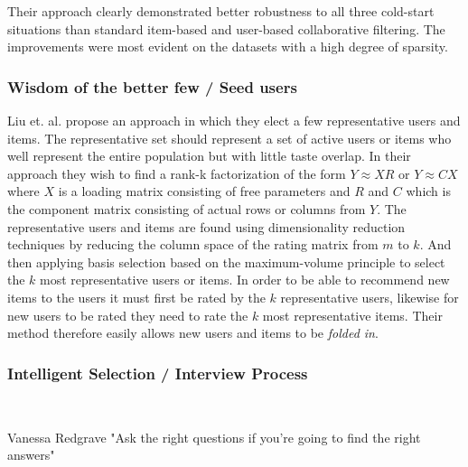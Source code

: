 Their approach clearly demonstrated better robustness to all three cold-start situations than standard item-based
and user-based collaborative filtering. The improvements were most evident on
the datasets with a high degree of sparsity.



\subsubsection{Wisdom of the better few / Seed users}


Liu et. al. \cite{Liu2011} propose an approach in which they elect a few
representative users and items. The representative set should represent a set
of active users or items who well represent the entire population but with
little taste overlap. In their approach they wish to find a rank-k
factorization of the form $Y \approx XR$ or $Y \approx CX$ where $X$ is a
loading matrix consisting of free parameters and $R$ and $C$ which is the
component matrix consisting of actual rows or columns from $Y$. The
representative users and items are found using dimensionality reduction
techniques by reducing the column space of the rating matrix from $m$ to $k$.
And then applying basis selection based on the maximum-volume principle to
select the $k$ most representative users or items. In order to be able to
recommend new items to the users it must first be rated by the $k$
representative users, likewise for new users to be rated they need to rate the
$k$ most representative items. Their method therefore easily allows new users
and items to be \emph{folded in}.



\subsubsection{Intelligent Selection / Interview Process}\mbox{}\\


\begin{chapquote}[30pt]{Vanessa Redgrave}
  "Ask the right questions if you're going to find the right answers"
\end{chapquote}

